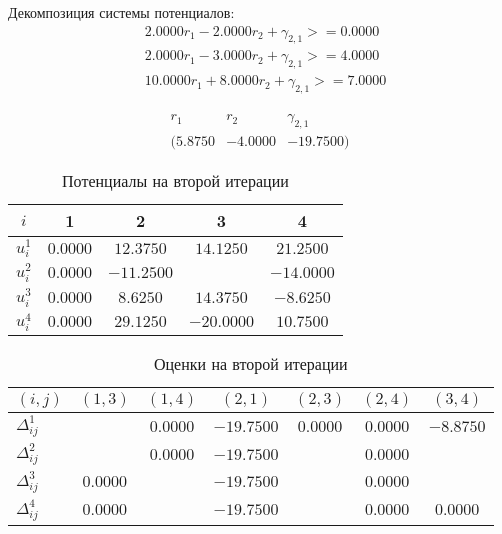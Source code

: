 \documentclass[a4paper,14pt,usenames,dvipsnames]{extreport}
\begin{document}
Декомпозиция системы потенциалов:
$$
\begin{aligned}
&2.0000 r_{1} - 2.0000 r_{2} + \gamma_{2,1} >= 0.0000 \\
&2.0000 r_{1} - 3.0000 r_{2} + \gamma_{2,1} >= 4.0000 \\
&10.0000 r_{1} + 8.0000 r_{2} + \gamma_{2,1} >= 7.0000 
\end{aligned}
$$

$$
\begin{array}{ccc}
r_{1} & r_{2} & \gamma_{2,1}\\
(5.8750 & -4.0000 & -19.7500)
\end{array}
$$

\begin{table}[H] 
\renewcommand{\arraystretch}{1.3}
\caption{Потенциалы на второй итерации} \label{tab:t11}
\begin{center}
\begin{tabular}{|c|c|c|c|c|}
\hline$i$ & 1 & 2 & 3 & 4 \\
\hline$u_{i}^{1}$ & $0.0000$ & $12.3750$ & $14.1250$ & $21.2500$\\
\hline$u_{i}^{2}$ & $0.0000$ & $-11.2500$ & & $-14.0000$ \\
\hline$u_{i}^{3}$ & $0.0000$ & $8.6250$ & $14.3750$ & $-8.6250$\\
\hline$u_{i}^{4}$ & $0.0000$ & $29.1250$ & $-20.0000$ & $10.7500$\\
\hline
\end{tabular}
\end{center}
\end{table}

\begin{table}[H] 
\renewcommand{\arraystretch}{1.3}
\caption{Оценки на второй итерации} \label{tab:t11}
\begin{center}
\begin{tabular}{|l|c|c|c|c|c|c|}
\hline$(i, j)$ & $(1,3)$ & $(1,4)$ & $(2,1)$ & $(2,3)$ & $(2,4)$ & $(3,4)$\\
\hline$\Delta_{i j}^{1}$ & & $0.0000$ & $-19.7500$ & $0.0000$ & $0.0000$ & $-8.8750$\\
\hline$\Delta_{i j}^{2}$ & & $0.0000$ & $-19.7500$ & & $0.0000$ & \\
\hline$\Delta_{i j}^{3}$ & $0.0000$ & & $-19.7500$ & & $0.0000$ & \\
\hline$\Delta_{i j}^{4}$ & $0.0000$ & & $-19.7500$ & & $0.0000$ & $0.0000$\\
\hline
\end{tabular}
\end{center}
\end{table}
\end{document}
